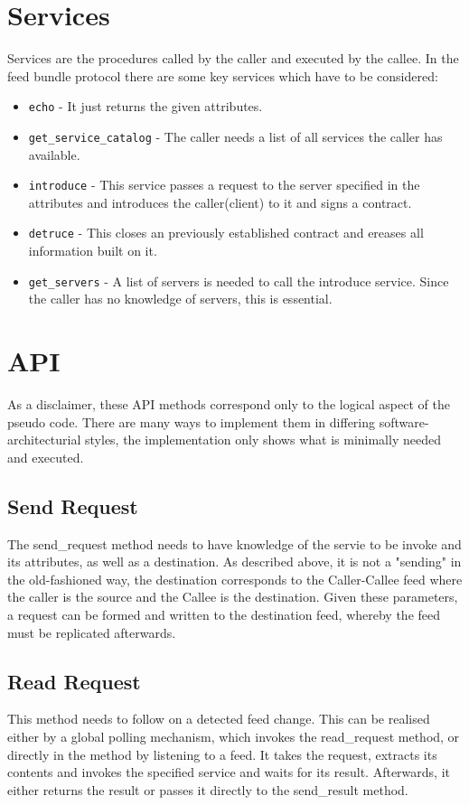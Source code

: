 \section{Services}
Services are the procedures called by the caller and executed by the callee. In the feed bundle protocol there are some key services which have to be considered:
\begin{itemize}
    \item \lstinline{echo} - It just returns the given attributes.
    \item \lstinline{get_service_catalog} - The caller needs a list of all services the caller has available.
    \item \lstinline{introduce} - This service passes a request to the server specified in the attributes and introduces the caller(client) to it and signs a contract.
    \item \lstinline{detruce} - This closes an previously established contract and ereases all information built on it.
    \item \lstinline{get_servers} - A list of servers is needed to call the introduce service. Since the caller has no knowledge of servers, this is essential.
\end{itemize}
\section{API}
As a disclaimer, these API methods correspond only to the logical aspect of the pseudo code. There are many ways to implement them in differing software-architecturial styles, the implementation only shows what is minimally needed and executed.
\subsection{Send Request}
The send\_request method needs to have knowledge of the servie to be invoke and its attributes, as well as a destination. As described above, it is not a "sending" in the old-fashioned way, the destination corresponds to the Caller-Callee feed where the caller is the source and the Callee is the destination. Given these parameters, a request can be formed and written to the destination feed, whereby the feed must be replicated afterwards.
\begin{python}
    
    
\end{python}

 
\subsection{Read Request}
This method needs to follow on a detected feed change. This can be realised either by a global polling mechanism, which invokes the read\_request method, or directly in the method by listening to a feed. It takes the request, extracts its contents and invokes the specified service and waits for its result. Afterwards, it either returns the result or passes it directly to the send\_result method.
\begin{python}
    
    
\end{python}


